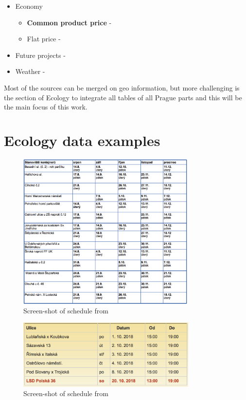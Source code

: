 \documentclass{article}
\begin{document}
\begin{itemize}
\begin{itemize}
        \end{itemize}
    \item Economy
        \begin{itemize}
            \item \textbf{Common product price} - \cite{Katalogp90:online}
            \item Flat price - \cite{Sreality94:online,}
        \end{itemize}
    \item Future projects -\cite{tenderarena:online}
    \item Weather - \cite{PortH90:online,Meteosta14:online}
\end{itemize}

Most of the sources can be merged on geo information, but more challenging is the section of Ecology to integrate all tables of all Prague parts and this will be the main focus of this work.


\printbibliography

\appendix

\section{Ecology data examples}
\begin{figure}[h]
    \centering
    \includegraphics[width=0.8\textwidth]{imgs/praha1.png}
    \caption{Screen-shot of schedule from \cite{Harmonog59:online}}
\end{figure}
\begin{figure}[h]
    \centering
    \includegraphics[width=0.8\textwidth]{imgs/praha2.png}
    \caption{Screen-shot of schedule from \cite{McPraha279:online}}
\end{figure}
\end{document}
